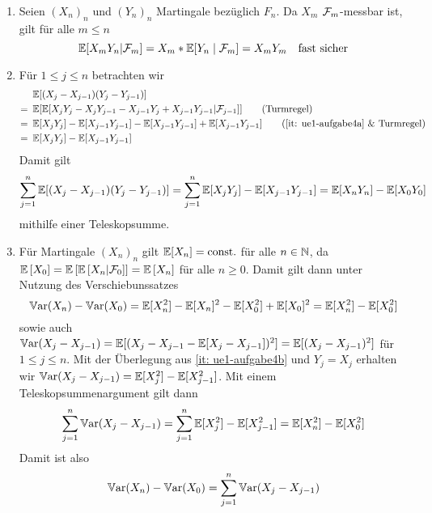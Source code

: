 \begin{exercisePage}
	\begin{enumerate}[label=(\alph*), leftmargin=*]
		\item \label{it: ue1-aufgabe4a} Seien $(X_n)_n$ und $(Y_n)_n$ Martingale bezüglich $F_n$. Da $X_m$ $\mathcal{F}_m$-messbar ist, gilt für alle $m \le n$
		\begin{equation*}
			\mathbb{E}[X_m Y_n | \mathcal{F}_m ] 
			= X_m * \mathbb{E}[Y_n\mid \mathcal{F}_m] 
			= X_m Y_m \quad \text{fast sicher}
		\end{equation*}
		\item \label{it: ue1-aufgabe4b} Für $1 \le j \le n$ betrachten wir
		\begin{align*}
			&\E[(X_j - X_{j-1})(Y_j - Y_{j-1})] \\
			= \enskip &\E[\E[X_j Y_j - X_j Y_{j-1} - X_{j-1} Y_j + X_{j-1} Y_{j-1} | \F_{j-1}]] \tag{Turmregel} \\
			= \enskip &\E[X_j Y_j] - \E[X_{j-1} Y_{j-1}] - \E[X_{j-1} Y_{j-1}] + \E[X_{j-1} Y_{j-1}] \tag{\ref{it: ue1-aufgabe4a} \& Turmregel} \\
			= \enskip &\E[X_j Y_j] - \E[X_{j-1} Y_{j-1}]
		\end{align*}
		Damit gilt
		\begin{equation*}
			\sum_{j=1}^n \mathbb{E}[(X_j - X_{j-1}) (Y_j - Y_{j-1})] 
			= \sum_{j=1}^n \mathbb{E}[X_j Y_j] - \mathbb{E}[X_{j-1} Y_{j-1}] 
			= \mathbb{E}[X_n Y_n] - \mathbb{E}[X_0 Y_0]
		\end{equation*} 
		mithilfe einer Teleskopsumme.
		\item Für Martingale $(X_n)_n$ gilt $\mathbb{E}[X_n] = \text{const.}$ für alle $n \in \mathbb{N}$, da $\mathbb{E} \left[ X_0 \right] = \mathbb{E} \left[ {\mathbb{E} \left[ X_n | \mathcal{F}_0 \right]} \right] = \mathbb{E} \left[ X_n \right]$ für alle $n \ge 0$. Damit gilt dann unter Nutzung des Verschiebunssatzes
		\begin{equation*}
			\operatorname{\mathbb Var}(X_n) - \operatorname{\mathbb Var}(X_0) = \mathbb{E}[X_n^2] - \mathbb{E}[X_n]^2 - \mathbb{E}[X_0^2] + \mathbb{E}[X_0]^2 = \mathbb{E}[X_n^2] - \mathbb{E}[X_0^2] 
		\end{equation*}
		sowie auch $\operatorname{\mathbb Var}(X_j - X_{j-1}) = \mathbb{E}[(X_j - X_{j-1} -\mathbb{E}[X_j - X_{j-1}])^2] = \mathbb{E}[(X_j-X_{j-1})^2]$ für $1 \le j \le n$.
		Mit der Überlegung aus \cref{it: ue1-aufgabe4b} und $Y_j = X_j$ erhalten wir $\operatorname{\mathbb Var}(X_j - X_{j-1}) = \mathbb{E}[X_j^2] - \mathbb{E}[X_{j-1}^2]$.
		Mit einem Teleskopsummenargument gilt dann
		\begin{equation*}
			\sum_{j=1}^n \operatorname{\mathbb Var}(X_j - X_{j-1}) = \sum_{j=1}^n \mathbb{E}[X_j^2] - \mathbb{E}[X_{j-1}^2] = \mathbb{E}[X_n^2]-\mathbb{E}[X_0^2]
		\end{equation*}
		Damit ist also
		\begin{equation*}
			\operatorname{\mathbb Var}(X_n) - \operatorname{\mathbb Var}(X_0) = \sum_{j=1}^n \operatorname{\mathbb Var}(X_j - X_{j-1})
		\end{equation*}

\end{enumerate}
\end{exercisePage}
